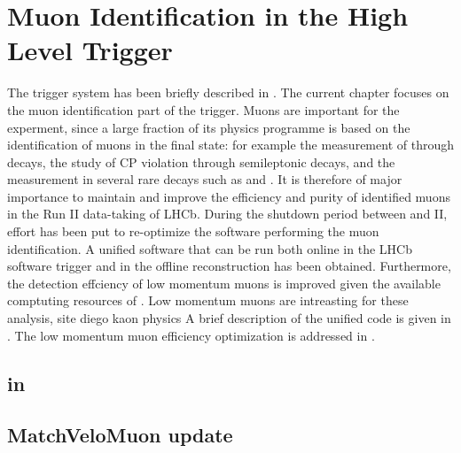 \chapter{Muon Identification in the \lhcb High Level Trigger}
\label{Muon_id_hlt}

The \lhcb trigger system has been briefly described in . The current chapter focuses on the muon identification
part of the trigger. Muons are important for the \lhcb experment, since a large fraction of its physics programme is based on
the identification of muons in the final state: for example the measurement of \phis through \BsJpsiPhi decays, the study of CP
violation through semileptonic decays, and the measurement
in several rare decays such as \BdKstmumu and \Bsmm. It is therefore of major importance to maintain and improve the efficiency
and purity of identified muons in the Run II data-taking of LHCb. During the shutdown period between \runone and II, effort has
been put to re-optimize the software performing the muon identification. A unified software that can be run both online in the
LHCb software trigger and in the offline reconstruction has been obtained. Furthermore, the detection effciency of low momentum
muons is improved given the available comptuting resources of \runtwo. Low momentum muons are intreasting {\color{red} for these analysis, site diego kaon physics}
A brief description of the unified \muonID code is given in . The low momentum muon efficiency optimization
is addressed in .

\section{\muonID in \hlt}
\label{muid_hlt1}


\section{MatchVeloMuon update}
\label{mvm_algorrithm}

